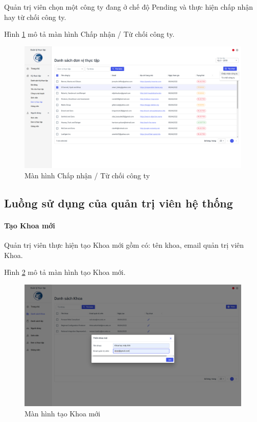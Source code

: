 \documentclass[./../main.tex]{subfiles}
\begin{document}
Quản trị viên chọn một công ty đang ở chế độ Pending và thực hiện chấp nhận hay từ chối công ty.

Hình \ref{fig:reject_or_approve_company} mô tả màn hình Chấp nhận / Từ chối công ty.

\begin{figure}[]
	\includegraphics[width=\linewidth]{./images/image21.png}
	\caption{Màn hình Chấp nhận / Từ chối công ty}
	\label{fig:reject_or_approve_company}
\end{figure}

\subsection{Luồng sử dụng của quản trị viên hệ thống}

\paragraph*{Tạo Khoa mới}

Quản trị viên thực hiện tạo Khoa mới gồm có: tên khoa, email quản trị viên Khoa.

Hình \ref{fig:add_org} mô tả màn hình tạo Khoa mới.

\begin{figure}[]
	\includegraphics[width=\linewidth]{./images/image23.png}
	\caption{Màn hình tạo Khoa mới}
	\label{fig:add_org}
\end{figure}
\end{document}
